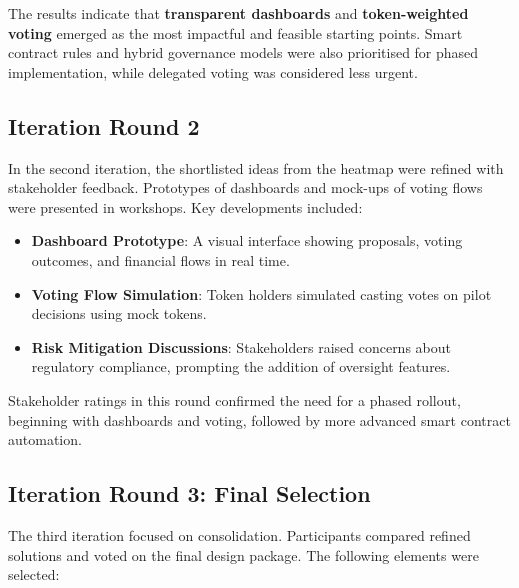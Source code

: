 \documentclass[
  english,
  12pt,
  oneside,
  open=any]{scrbook}
\providecommand{\tightlist}{%
  \setlength{\itemsep}{0pt}\setlength{\parskip}{0pt}}\usepackage{longtable,booktabs,array}
\begin{document}
The results indicate that \textbf{transparent dashboards} and
\textbf{token-weighted voting} emerged as the most impactful and
feasible starting points. Smart contract rules and hybrid governance
models were also prioritised for phased implementation, while delegated
voting was considered less urgent.

\subsection{Iteration Round 2}\label{sec-it2}

In the second iteration, the shortlisted ideas from the heatmap were
refined with stakeholder feedback. Prototypes of dashboards and mock-ups
of voting flows were presented in workshops. Key developments included:

\begin{itemize}
\tightlist
\item
  \textbf{Dashboard Prototype}: A visual interface showing proposals,
  voting outcomes, and financial flows in real time.\\
\item
  \textbf{Voting Flow Simulation}: Token holders simulated casting votes
  on pilot decisions using mock tokens.\\
\item
  \textbf{Risk Mitigation Discussions}: Stakeholders raised concerns
  about regulatory compliance, prompting the addition of oversight
  features.
\end{itemize}

Stakeholder ratings in this round confirmed the need for a phased
rollout, beginning with dashboards and voting, followed by more advanced
smart contract automation.

\subsection{Iteration Round 3: Final Selection}\label{sec-it3}

The third iteration focused on consolidation. Participants compared
refined solutions and voted on the final design package. The following
elements were selected:
\end{document}
